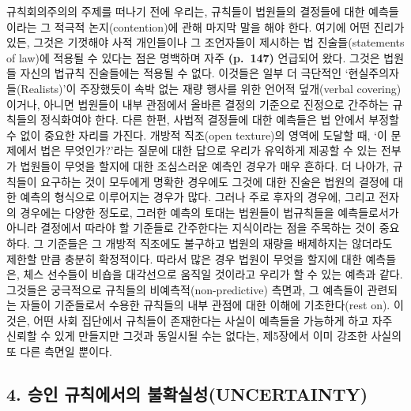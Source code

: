 규칙회의주의의 주제를 떠나기 전에 우리는, 규칙들이 법원들의 결정들에
대한 예측들이라는 그 적극적 논지(contention)에 관해 마지막 말을 해야
한다. 여기에 어떤 진리가 있든, 그것은 기껏해야 사적 개인들이나 그
조언자들이 제시하는 법 진술들(statements of law)에 적용될 수 있다는 점은
명백하며 자주 \textbf{(p.~147)} 언급되어 왔다. 그것은 법원들 자신의
법규칙 진술들에는 적용될 수 없다. 이것들은 일부 더 극단적인
‘현실주의자들(Realists)’이 주장했듯이 속박 없는 재량 행사를 위한 언어적
덮개(verbal covering)이거나, 아니면 법원들이 내부 관점에서 올바른 결정의
기준으로 진정으로 간주하는 규칙들의 정식화여야 한다. 다른 한편, 사법적
결정들에 대한 예측들은 법 안에서 부정할 수 없이 중요한 자리를 가진다.
개방적 직조(open texture)의 영역에 도달할 때, ‘이 문제에서 법은
무엇인가?’라는 질문에 대한 답으로 우리가 유익하게 제공할 수 있는 전부가
법원들이 무엇을 할지에 대한 조심스러운 예측인 경우가 매우 흔하다. 더
나아가, 규칙들이 요구하는 것이 모두에게 명확한 경우에도 그것에 대한
진술은 법원의 결정에 대한 예측의 형식으로 이루어지는 경우가 많다. 그러나
주로 후자의 경우에, 그리고 전자의 경우에는 다양한 정도로, 그러한 예측의
토대는 법원들이 법규칙들을 예측들로서가 아니라 결정에서 따라야 할
기준들로 간주한다는 지식이라는 점을 주목하는 것이 중요하다. 그 기준들은
그 개방적 직조에도 불구하고 법원의 재량을 배제하지는 않더라도 제한할
만큼 충분히 확정적이다. 따라서 많은 경우 법원이 무엇을 할지에 대한
예측들은, 체스 선수들이 비숍을 대각선으로 움직일 것이라고 우리가 할 수
있는 예측과 같다. 그것들은 궁극적으로 규칙들의 비예측적(non-predictive)
측면과, 그 예측들이 관련되는 자들이 기준들로서 수용한 규칙들의 내부
관점에 대한 이해에 기초한다(rest on). 이것은, 어떤 사회 집단에서
규칙들이 존재한다는 사실이 예측들을 가능하게 하고 자주 신뢰할 수 있게
만들지만 그것과 동일시될 수는 없다는, 제5장에서 이미 강조한 사실의 또
다른 측면일 뿐이다.

\subsection{4. 승인 규칙에서의
불확실성(UNCERTAINTY)}\label{uxc2b9uxc778-uxaddcuxce59uxc5d0uxc11cuxc758-uxbd88uxd655uxc2e4uxc131uncertainty}

